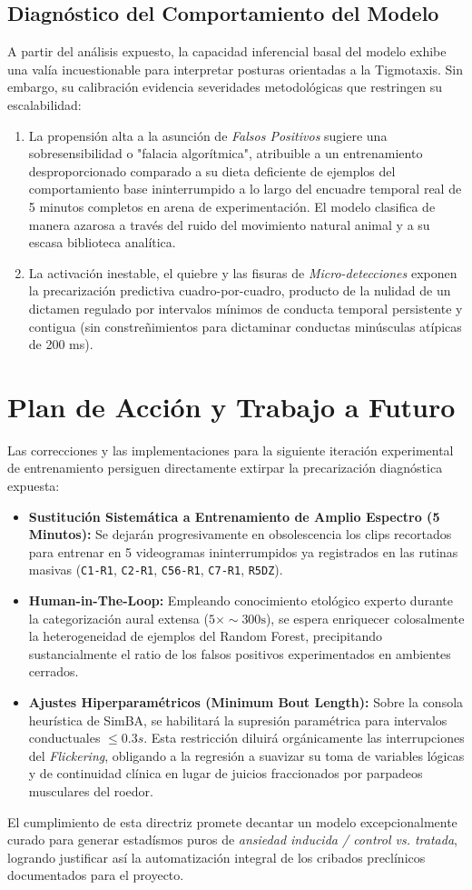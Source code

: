 \documentclass[12pt,a4paper]{article}
\begin{document}
\subsection{Diagnóstico del Comportamiento del Modelo}
A partir del análisis expuesto, la capacidad inferencial basal del modelo exhibe una valía incuestionable para interpretar posturas orientadas a la Tigmotaxis. Sin embargo, su calibración evidencia severidades metodológicas que restringen su escalabilidad:
\begin{enumerate}
    \item La propensión alta a la asunción de \textit{Falsos Positivos} sugiere una sobresensibilidad o "falacia algorítmica", atribuible a un entrenamiento desproporcionado comparado a su dieta deficiente de ejemplos del comportamiento base ininterrumpido a lo largo del encuadre temporal real de 5 minutos completos en arena de experimentación. El modelo clasifica de manera azarosa a través del ruido del movimiento natural animal y a su escasa biblioteca analítica.
    \item La activación inestable, el quiebre y las fisuras de \textit{Micro-detecciones} exponen la precarización predictiva cuadro-por-cuadro, producto de la nulidad de un dictamen regulado por intervalos mínimos de conducta temporal persistente y contigua (sin constreñimientos para dictaminar conductas minúsculas atípicas de 200 ms).
\end{enumerate}

\section{Plan de Acción y Trabajo a Futuro}
Las correcciones y las implementaciones para la siguiente iteración experimental de entrenamiento persiguen directamente extirpar la precarización diagnóstica expuesta:

\begin{itemize}
    \item \textbf{Sustitución Sistemática a Entrenamiento de Amplio Espectro (5 Minutos):} Se dejarán progresivamente en obsolescencia los clips recortados para entrenar en 5 videogramas ininterrumpidos ya registrados en las rutinas masivas (\texttt{C1-R1}, \texttt{C2-R1}, \texttt{C56-R1}, \texttt{C7-R1}, \texttt{R5DZ}).
    \item \textbf{Human-in-The-Loop:} Empleando conocimiento etológico experto durante la categorización aural extensa ($5 \times \sim300\text{s}$), se espera enriquecer colosalmente la heterogeneidad de ejemplos del Random Forest, precipitando sustancialmente el ratio de los falsos positivos experimentados en ambientes cerrados.
    \item \textbf{Ajustes Hiperparamétricos (Minimum Bout Length):} Sobre la consola heurística de SimBA, se habilitará la supresión paramétrica para intervalos conductuales $\leq 0.3 s$. Esta restricción diluirá orgánicamente las interrupciones del \textit{Flickering}, obligando a la regresión a suavizar su toma de variables lógicas y de continuidad clínica en lugar de juicios fraccionados por parpadeos musculares del roedor.
\end{itemize}

El cumplimiento de esta directriz promete decantar un modelo excepcionalmente curado para generar estadísmos puros de \textit{ansiedad inducida / control \textit{vs.} tratada}, logrando justificar así la automatización integral de los cribados preclínicos documentados para el proyecto.
\end{document}
